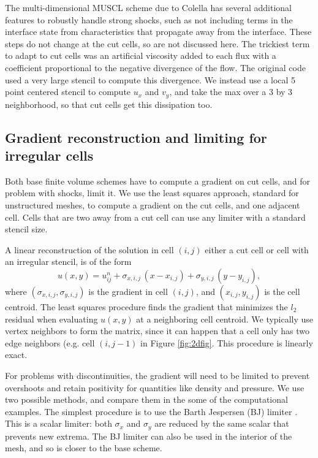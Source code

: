 The multi-dimensional MUSCL scheme due to Colella has several additional
features to robustly handle strong shocks, such as not including terms in the
interface state from characteristics that propagate away from the interface. These
steps do not change at the cut cells, so are not discussed here.  The
trickiest term to adapt to cut cells was an artificial viscosity 
added to each flux with a
coefficient proportional to the negative divergence of the flow.  The original
code used a very large stencil to compute this divergence. We instead use a local 5
point centered stencil to compute $u_x$ and $v_y$, and take the max over a 3 by 3
neighborhood, so that cut cells get this dissipation too.

\subsection{Gradient reconstruction and limiting for irregular
cells}\label{sec:limit}

Both base finite volume schemes have to compute a gradient on cut cells, and for
problem with shocks, limit it. 
We use the least squares approach, standard for unstructured meshes,
to compute a gradient on the cut cells, and one adjacent cell.
Cells that are two away from a cut cell
can use any limiter with a standard stencil size. 

A linear reconstruction of the solution in cell $(i,j)$
either a cut cell or cell with an irregular stencil, is of the form
\begin{equation}
u(x,y) = u_{ij}^n + \sigma_{x,i,j} \,(x-x_{i,j}) +
                     \sigma_{y,i,j}\,(y-y_{i,j}),
\label{eqn:lls}
\end{equation}
where $(\sigma_{x,i,j},\sigma_{y,i,j})$ is the gradient in 
cell $(i,j)$, and $(x_{i,j},y_{i,j})$ is the cell centroid. The least squares procedure
finds the gradient that minimizes the $l_2$ residual when evaluating  $u(x,y)$
at a neighboring cell centroid. We typically use vertex neighbors to form the matrix,
since it can happen that a cell only has two edge neighbors (e.g. cell $(i,j-1)$ in
Figure \ref{fig:2dfig}.  This procedure is linearly exact.  

For problems with discontinuities, the gradient will need to be limited
to prevent overshoots and retain positivity for quantities like density and
pressure.
We use two possible methods, and compare them in the some of the 
computational examples.
The simplest procedure  is to use the Barth Jespersen (BJ) limiter
\cite{barth-jespersen}. 
This is a scalar limiter: both $\sigma_x$ and $\sigma_y$ are reduced by
the same scalar that prevents new extrema.  The BJ limiter  can also be
used in the interior of the mesh, and so is closer to the base scheme. 

